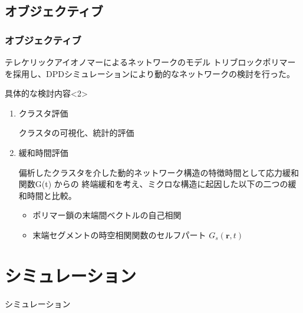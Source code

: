 \documentclass[12pt, dvipdfmx]{beamer}
\begin{document}
\subsection{オブジェクティブ}

\begin{frame}
\frametitle{オブジェクティブ}
	\begin{block}{テレケリックアイオノマーによるネットワークのモデル}
	トリブロックポリマーを採用し、DPDシミュレーションにより動的なネットワークの検討を行った。
	\end{block}

	\begin{exampleblock}{具体的な検討内容}<2>
		\begin{enumerate}
		\item
		クラスタ評価

		クラスタの可視化、統計的評価
		\item
		緩和時間評価
		
		偏析したクラスタを介した動的ネットワーク構造の特徴時間として応力緩和関数G(t) からの{\color{red} 終端緩和}を考え、ミクロな構造に起因した以下の二つの緩和時間と比較。
		\begin{itemize}
		\item
		{\color{blue} ポリマー鎖の末端間ベクトルの自己相関}
		\item
		{\color{blue} 末端セグメントの時空相関関数のセルフパート $G_s(\bm{r},t)$}
		\end{itemize}
		\end{enumerate}
	\end{exampleblock}
\end{frame}

\section{シミュレーション}
\begin{frame}
\LARGE{シミュレーション}
\end{frame}

\end{document}
